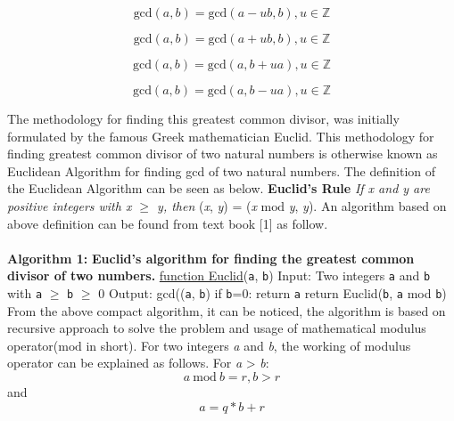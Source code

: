 \documentclass[conference,compsoc]{IEEEtran}
\newcommand{\Z}{{\mathbb Z}}
\newcommand{\var}[1]{\textit{#1}}
\newcommand{\progvar}[1]{\texttt{#1}}
\renewcommand{\mod}{\text{mod}}
\renewcommand{\gcd}{\text{gcd}}
\begin{document}
\begin{equation} \label{eq:gcd_mul_difference} 
\gcd(a,b) = \gcd(a-ub,b), u\in\Z
\end{equation}

\begin{equation} \label{eq:gcd_mul_difference}  
\gcd(a,b) = \gcd(a+ub,b), u\in\Z
\end{equation}

\begin{equation} \label{eq:gcd_mul_difference} 
\gcd(a,b) = \gcd(a, b+ua), u\in\Z
\end{equation}

\begin{equation} \label{eq:gcd_mul_difference} 
\gcd(a,b) = \gcd(a, b-ua), u\in\Z
\end{equation}

The methodology for finding this greatest common divisor, was initially formulated by the famous Greek mathematician Euclid. This methodology for finding greatest common divisor of two natural numbers is otherwise known as Euclidean Algorithm for finding gcd of two natural numbers. The definition of the Euclidean Algorithm can be seen as below.
\newline \newline \textbf {Euclid's Rule} \textit {If x and y are positive integers with x $\geq$ y, then} \newline 
\gcd(\var{x}, \var{y}) = \gcd(\var{x} $\mod $ \var{y}, \var{y}).
\newline 
\newline An algorithm based on above definition can be found from text book [1] as follow.
\\~\\
\textbf{Algorithm 1:}
\newline
\textbf {Euclid's algorithm for finding the greatest common divisor of two numbers.}\newline
\underline {function Euclid}(\progvar{a}, \progvar{b})
\newline 
Input: Two integers \progvar{a} and \progvar{b} with \progvar{a} $\geq$ \progvar{b} $\geq$ 0 
\newline Output: gcd((\progvar{a}, \progvar{b})
\newline
\newline if \progvar{b}=0: return \progvar{a}
\newline return Euclid(\progvar{b}, \progvar{a} mod \progvar{b})
\newline 
\newline From the above compact algorithm, it can be noticed, the algorithm is based on recursive approach to solve the problem and usage of mathematical modulus operator($\mod $ in short).
For two integers \var{a} and \var{b}, the working of modulus operator can be explained as follows.
For \var{a} > \var{b}:
\begin{equation} \label{eq:gcd_modulus_1}
a \> \mod \> b = r,  b > r
\end{equation}
and
\begin{equation} \label{eq:gcd_modulus_2}
a = q * b + r
\end{equation}
\end{document}
